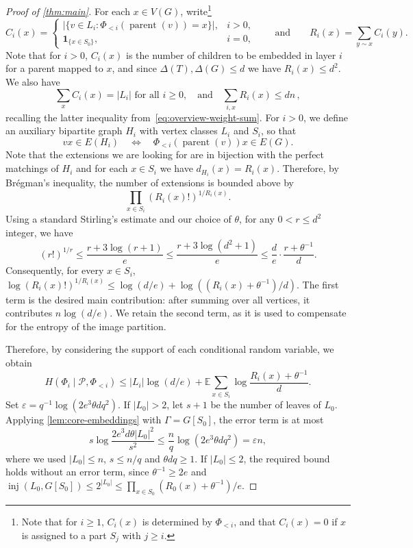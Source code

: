 \documentclass[reqno,final,a4paper]{amsart}
\numberwithin{equation}{section}
\theoremstyle{definition}
\theoremstyle{remark}
\DeclareMathOperator{\parent}{parent}
\DeclareMathOperator{\inj}{inj}
\begin{document}
\begin{proof}[Proof of \cref{thm:main}]
For each $x\in V(G)$, write\footnote{Note that for $i \geq 1$, $C_i(x)$ is determined by $\Phi_{<i}$, and that $C_i(x) =0$ if $x$ is assigned to a part $S_j$ with $j \geq i$.} 
\[
C_i(x)=
\begin{cases}
\bigl|\{v\in L_i:\Phi_{<i}(\parent(v))=x\}\bigr|, & i>0,\\
\mathbf{1}_{\{x\in S_0\}}, & i=0,
\end{cases}
\qquad\text{and}\qquad
R_i(x)=\sum_{y\sim x}C_i(y).
\]
Note that for $i>0$, $C_i(x)$ is the number of children to be embedded in layer $i$ for a parent mapped to $x$, and since $\Delta(T),\Delta(G)\leq d$ we have $R_i(x)\leq d^2$. We also have
$$\sum_xC_i(x)=|L_i|\text{ for all }i\geq 0,\quad \text{and}\quad \sum_{i,x}R_i(x)\leq dn\,,$$
recalling the latter inequality from~\eqref{eq:overview-weight-sum}.
For $i>0$, we define an auxiliary bipartite graph $H_i$ with vertex classes $L_i$ and $S_i$, so that
$$vx\in E(H_i) \quad \Longleftrightarrow \quad \Phi_{<i}(\parent(v))x\in E(G).$$
Note that the extensions we are looking for are in bijection with the perfect matchings of $H_i$ and for each $x\in S_i$ we have $d_{H_i}(x)=R_i(x)$. Therefore, by Brégman's inequality, the number of extensions is bounded above by
$$\prod_{x\in S_i}(R_i(x)!)^{1/R_i(x)}.$$
Using a standard Stirling's estimate and our choice of $\theta$, for any $0<r\leq d^2$ integer, we have 
$$(r!)^{1/r}\leq \frac{r+3\log(r+1)}{e}\leq \frac{r+3\log(d^2+1)}{e}\leq \frac{d}{e}\cdot \frac{r+\theta^{-1}}{d}.$$
Consequently, for every $x \in S_i$,
$
     \log \left(R_i(x)! \right)^{1/R_i(x)} \leq \log (d/e) + \log ((R_i(x)+\theta^{-1})/d).
$
The first term is the desired main contribution: after summing over all vertices, it contributes $n \log (d/e)$. We retain the second term, as it is used to compensate for the entropy of the image partition. 

Therefore, by considering the support of each conditional random variable, we obtain
\begin{equation}\label{eqn:layerentropy}
    H(\Phi_i\mid\mathcal{P},\Phi_{<i})\leq |L_i|\log\left(d/e\right)+
    \mathbb{E}\sum_{x\in S_i}\log\frac{R_i(x)+\theta^{-1}}{d}.
\end{equation}
Set $\varepsilon=q^{-1}\log(2e^3\theta dq^2)$.
If $|L_0|>2$, let $s+1$ be the number of leaves of $L_0$.
Applying \cref{lem:core-embeddings} with $\Gamma=G[S_0]$,
the error term is at most
$$
s\log\frac{2e^3d\theta |L_0|^2}{s^2}
\le \frac nq\log(2e^3\theta dq^2)
=\varepsilon n,
$$
where we used $|L_0|\le n$, $s\le n/q$ and $\theta dq\ge1$.
If $|L_0|\leq 2$, the required bound holds without an error term,
since $\theta^{-1}\ge2e$ and $\inj(L_0,G[S_0])\leq 2^{|L_0|}\leq \prod_{x\in S_0}(R_0(x)+\theta^{-1})/e.$


\end{proof}
\end{document}
